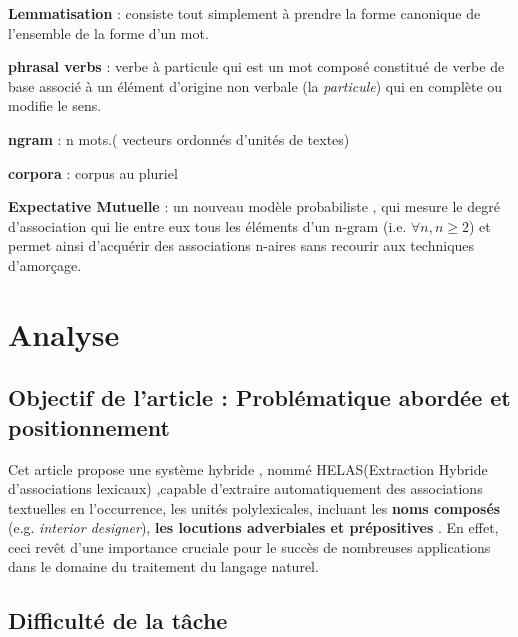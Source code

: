 \documentclass[a4paper,12pt]{article}
\begin{document}
        \textbf{Lemmatisation} : consiste tout simplement à prendre la forme canonique de l'ensemble de la forme d'un mot.
        
        \textbf{phrasal verbs} : verbe à particule qui est un mot composé constitué de verbe de base associé à un élément d'origine non verbale (la \textit{particule}) qui en complète ou modifie le sens.
        
        \textbf{ngram} : n mots.( vecteurs ordonn\'es d'unit\'es de textes)
        
        \textbf{corpora} : corpus au pluriel
        
        \textbf{Expectative Mutuelle} : un nouveau mod\`ele probabiliste , qui mesure le degr\'e d'association qui lie entre eux tous les \'el\'ements d'un n-gram (i.e. $\forall n, n \geq 2 $) et permet ainsi d'acqu\'erir des associations n-aires sans recourir aux techniques d'amor\c cage. 
        
\section{Analyse}

    \subsection{Objectif de l'article : Problématique abordée et positionnement}
        Cet article propose une système hybride , nomm\'e HELAS(Extraction Hybride d'associations lexicaux) ,capable d'extraire automatiquement des associations textuelles en l'occurrence, les unités polylexicales, incluant les \textbf{noms composés} (e.g. \textit{interior designer}), \textbf{les locutions adverbiales et prépositives} . En effet, ceci revêt d'une importance cruciale pour le succès de nombreuses applications dans le domaine du traitement du langage naturel.
    
    \subsection{Difficulté de la tâche}
    
\end{document}
